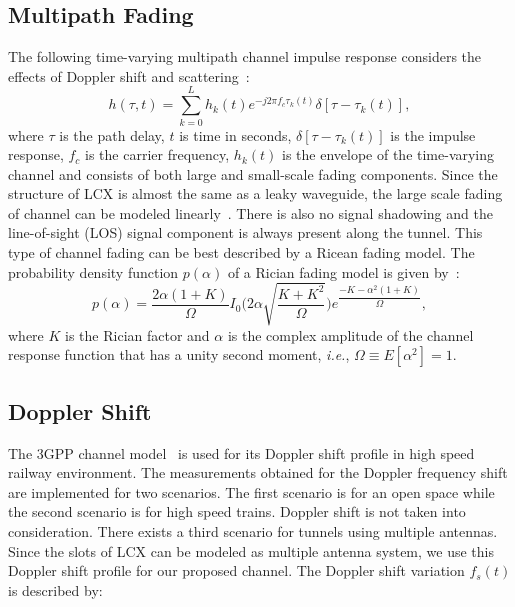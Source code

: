 \subsection{Multipath Fading}
The following time-varying multipath channel impulse response considers the effects of Doppler shift and scattering~\cite{booklter13}:
\begin{equation}
\label{channel}
{h}(\tau,t)= \sum_{k=0}^{L}{h_k}(t)e^{-j2\pi f_c\tau_k(t)}\delta[\tau-\tau_k(t)],
\end{equation}
where $\tau$ is the path delay, $t$ is time in seconds, $\delta[\tau-\tau_k(t)]$ is the impulse response, $f_c$ is the carrier frequency, $h_k(t)$ is the envelope of the time-varying channel and consists of both large and small-scale fading components. Since the structure of LCX is almost the same as a leaky waveguide, the large scale fading of channel can be modeled linearly~\cite{arlter10}. There is also no signal shadowing and the line-of-sight (LOS) signal component is always present along the tunnel. This type of channel fading can be best described by a Ricean fading model. The probability density function $p(\alpha)$ of a Rician fading model is given by~\cite{inplter12}:
\begin{equation}
p(\alpha) = \dfrac{2\alpha(1+K)}{\Omega}I_0\Bigg(2\alpha\sqrt{\dfrac{K+K^2}{\Omega}}\Bigg)e^{\dfrac{-K-\alpha^2(1+K)}{\Omega}},
\end{equation}
where $K$ is the Rician factor and $\alpha$ is the complex amplitude of the channel response function that has a unity second moment, \textit{i.e.}, $\Omega \equiv E[\alpha^2] = 1$.

\subsection{Doppler Shift}
The 3GPP channel model~\cite{trlter14} is used for its Doppler shift profile in high speed railway environment. The measurements obtained for the Doppler frequency shift are implemented for two scenarios. The first scenario is for an open space while the second scenario is for high speed trains. Doppler shift is not taken into consideration. There exists a third scenario for tunnels using multiple antennas. Since the slots of LCX can be modeled as multiple antenna system, we use this Doppler shift profile for our proposed channel. The Doppler shift variation $f_s(t)$ is described by:

